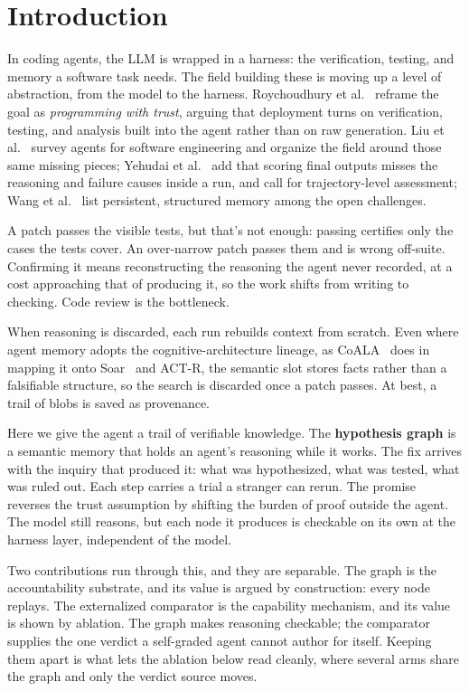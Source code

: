 \documentclass[sigconf,review,anonymous]{acmart}
\begin{document}
\section{Introduction}\label{sec:intro}

In coding agents, the LLM is wrapped in a harness: the verification, testing, and memory a software task needs. The field building these is moving up a level of abstraction, from the model to the harness. Roychoudhury et al.~\cite{roychoudhury2025} reframe the goal as \emph{programming with trust}, arguing that deployment turns on verification, testing, and analysis built into the agent rather than on raw generation. Liu et al.~\cite{liu2024survey} survey agents for software engineering and organize the field around those same missing pieces; Yehudai et al.~\cite{yehudai2025} add that scoring final outputs misses the reasoning and failure causes inside a run, and call for trajectory-level assessment; Wang et al.~\cite{wang2025survey} list persistent, structured memory among the open challenges.

A patch passes the visible tests, but that's not enough: passing certifies only the cases the tests cover. An over-narrow patch passes them and is wrong off-suite. Confirming it means reconstructing the reasoning the agent never recorded, at a cost approaching that of producing it, so the work shifts from writing to checking. Code review is the bottleneck.

When reasoning is discarded, each run rebuilds context from scratch. Even where agent memory adopts the cognitive-architecture lineage, as CoALA~\cite{coala} does in mapping it onto Soar~\cite{soar} and ACT-R, the semantic slot stores facts rather than a falsifiable structure, so the search is discarded once a patch passes. At best, a trail of blobs is saved as provenance.

Here we give the agent a trail of verifiable knowledge. The \textbf{hypothesis graph} is a semantic memory that holds an agent's reasoning while it works. The fix arrives with the inquiry that produced it: what was hypothesized, what was tested, what was ruled out. Each step carries a trial a stranger can rerun. The promise reverses the trust assumption by shifting the burden of proof outside the agent. The model still reasons, but each node it produces is checkable on its own at the harness layer, independent of the model.

Two contributions run through this, and they are separable. The graph is the accountability substrate, and its value is argued by construction: every node replays. The externalized comparator is the capability mechanism, and its value is shown by ablation. The graph makes reasoning checkable; the comparator supplies the one verdict a self-graded agent cannot author for itself. Keeping them apart is what lets the ablation below read cleanly, where several arms share the graph and only the verdict source moves.
\end{document}
